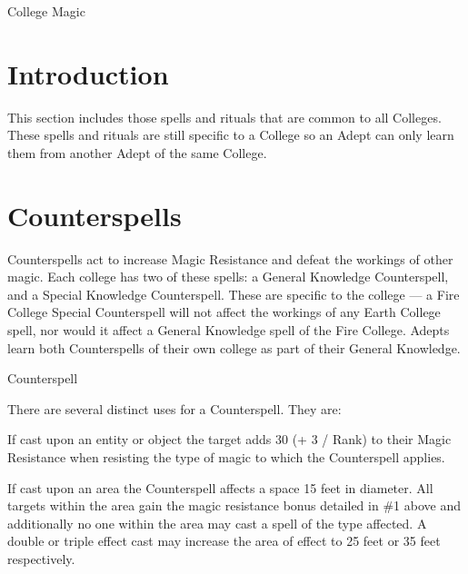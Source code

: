 \begin{Chapter}{College Magic}

\section{Introduction}

This section includes those spells and rituals that are common to all
Colleges. These spells and rituals are still specific to a College so
an Adept can only learn them from another Adept of the same College.

\section{Counterspells}

Counterspells act to increase Magic Resistance and defeat the workings
of other magic.  Each college has two of these spells: a General
Knowledge Counterspell, and a Special Knowledge Counterspell.  These
are specific to the college — a Fire College Special Counterspell will
not affect the workings of any Earth College spell, nor would it
affect a General Knowledge spell of the Fire College.  Adepts learn
both Counterspells of their own college as part of their General
Knowledge.

\begin{spell}{Counterspell}
\begin{effects}
There are several distinct uses for a Counterspell. They are: 

\begin{Itemize}
  
\item If cast upon an entity or object the target adds 30 (+ 3 / Rank)
  to their Magic Resistance when resisting the type of magic to which
  the Counterspell applies.

\item If cast upon an area the Counterspell affects a space 15 feet in
  diameter.  All targets within the area gain the magic resistance
  bonus detailed in \#1 above and additionally no one within the area
  may cast a spell of the type affected. A double or triple effect
  cast may increase the area of effect to 25 feet or 35 feet
  respectively.


\end{Itemize}
\end{effects}
\end{spell}
\end{Chapter}

